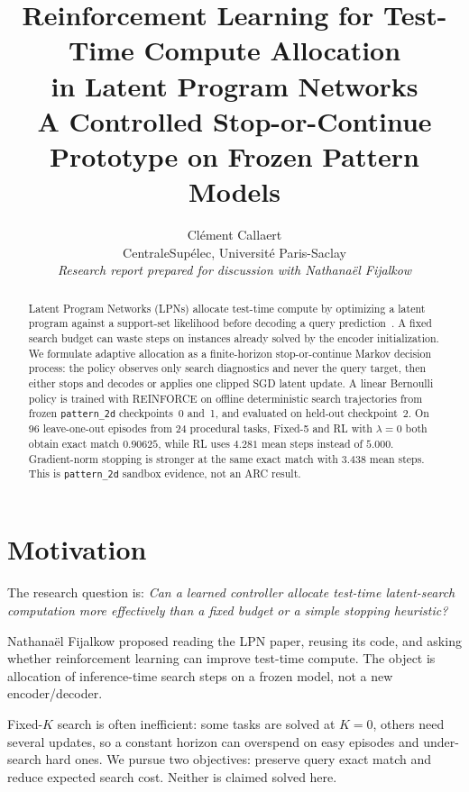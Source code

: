 \documentclass[11pt,a4paper]{article}
\title{Reinforcement Learning for Test-Time Compute Allocation\\
in Latent Program Networks\\[0.35em]
\large A Controlled Stop-or-Continue Prototype on Frozen Pattern Models}
\author{Cl\'ement Callaert\\
CentraleSup\'elec, Universit\'e Paris-Saclay\\[0.25em]
\textit{Research report prepared for discussion with Nathana\"el Fijalkow}}
\date{}
\begin{document}
\maketitle

\begin{abstract}
Latent Program Networks (LPNs) allocate test-time compute by optimizing a
latent program against a support-set likelihood before decoding a query
prediction~\cite{macfarlane2024lpn}.
A fixed search budget can waste steps on instances already solved by the
encoder initialization.
We formulate adaptive allocation as a finite-horizon stop-or-continue Markov
decision process: the policy observes only search diagnostics and never the
query target, then either stops and decodes or applies one clipped SGD latent
update.
A linear Bernoulli policy is trained with REINFORCE on offline deterministic
search trajectories from frozen \texttt{pattern\_2d} checkpoints~0 and~1, and
evaluated on held-out checkpoint~2.
On 96 leave-one-out episodes from 24 procedural tasks, Fixed-5 and RL with
$\lambda{=}0$ both obtain exact match $0.90625$, while RL uses $4.281$ mean
steps instead of $5.000$.
Gradient-norm stopping is stronger at the same exact match with $3.438$ mean
steps.
This is \texttt{pattern\_2d} sandbox evidence, not an ARC result.
\end{abstract}

\section{Motivation}

The research question is:
\emph{Can a learned controller allocate test-time latent-search computation
more effectively than a fixed budget or a simple stopping heuristic?}

Nathana\"el Fijalkow proposed reading the LPN paper, reusing its code, and
asking whether reinforcement learning can improve test-time compute.
The object is allocation of inference-time search steps on a frozen model, not
a new encoder/decoder.

Fixed-$K$ search is often inefficient: some tasks are solved at $K{=}0$, others
need several updates, so a constant horizon can overspend on easy episodes and
under-search hard ones.
We pursue two objectives: preserve query exact match and reduce expected search
cost.
Neither is claimed solved here.
\end{document}

